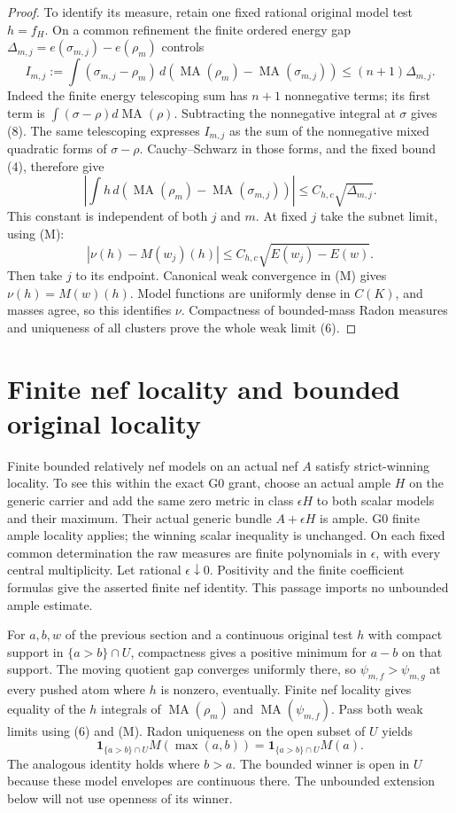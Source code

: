 \documentclass[11pt]{article}
\newcommand{\MA}{\operatorname{MA}}
\begin{document}
\begin{proof}
To identify its measure, retain one fixed rational original model
test $h=f_H$. On a common refinement the finite ordered energy gap
$\Delta_{m,j}=e(\sigma_{m,j})-e(\rho_m)$ controls
\[
 I_{m,j}:=\int(\sigma_{m,j}-\rho_m)
                   \,d(\MA(\rho_m)-\MA(\sigma_{m,j}))
        \leq(n+1)\Delta_{m,j}.                           \tag{8}
\]
Indeed the finite energy telescoping sum has $n+1$ nonnegative
terms; its first term is $\int(\sigma-\rho)d\MA(\rho)$.
Subtracting the nonnegative integral at $\sigma$ gives (8).
The same telescoping expresses $I_{m,j}$ as the sum of the
nonnegative mixed quadratic forms of $\sigma-\rho$.
Cauchy--Schwarz in those forms, and the fixed bound (4), therefore give
\[
 \left|\int h\,d(\MA(\rho_m)-\MA(\sigma_{m,j}))\right|
       \leq C_{h,c}\sqrt{\Delta_{m,j}}.                  \tag{9}
\]
This constant is independent of both $j$ and $m$.
At fixed $j$ take the subnet limit, using (M):
\[
 |\nu(h)-M(w_j)(h)|
       \leq C_{h,c}\sqrt{E(w_j)-E(w)}.
\]
Then take $j$ to its endpoint. Canonical weak convergence in (M)
gives $\nu(h)=M(w)(h)$. Model functions are uniformly dense in
$C(K)$, and masses agree, so this identifies $\nu$.
Compactness of bounded-mass Radon measures and uniqueness of all
clusters prove the whole weak limit (6).
\end{proof}

\section{Finite nef locality and bounded original locality}
Finite bounded relatively nef models on an actual nef $A$ satisfy
strict-winning locality. To see this within the exact G0 grant,
choose an actual ample $H$ on the generic carrier and add the same
zero metric in class $\epsilon H$ to both scalar models and their
maximum. Their actual generic bundle $A+\epsilon H$ is ample.
G0 finite ample locality applies; the winning scalar inequality
is unchanged. On each fixed common determination the raw measures
are finite polynomials in $\epsilon$, with every central multiplicity.
Let rational $\epsilon\downarrow0$. Positivity and the finite
coefficient formulas give the asserted finite nef identity.
This passage imports no unbounded ample estimate.

For $a,b,w$ of the previous section and a continuous original test
$h$ with compact support in $\{a>b\}\cap U$, compactness gives a
positive minimum for $a-b$ on that support.
The moving quotient gap converges uniformly there, so
$\psi_{m,f}>\psi_{m,g}$ at every pushed atom where $h$ is nonzero,
eventually. Finite nef locality gives equality of the $h$ integrals
of $\MA(\rho_m)$ and $\MA(\psi_{m,f})$.
Pass both weak limits using (6) and (M).
Radon uniqueness on the open subset of $U$ yields
\[
 \mathbf1_{\{a>b\}\cap U}M(\max(a,b))
       =\mathbf1_{\{a>b\}\cap U}M(a).                   \tag{10}
\]
The analogous identity holds where $b>a$.
The bounded winner is open in $U$ because these model envelopes are
continuous there. The unbounded extension below will not use
openness of its winner.
\end{document}

